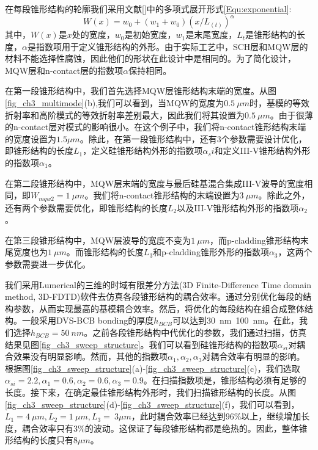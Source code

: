 在每段锥形结构的轮廓我们采用文献[]中的多项式展开形式\ref{Equ:exponential}:
\begin{equation}
\label{Equ:exponential}
W(x) = w_0+(w_1+w_0)\left(x/L_(t)\right)^\alpha
\end{equation}
其中，$W(x)$是$x$处的宽度，$w_0$是初始宽度，$w_1$是末尾宽度，$L_t$是锥形结构的长度，$\alpha$是指数项用于定义锥形结构的外形。由于实际工艺中，SCH层和MQW层的材料不能选择性腐蚀，因此他们的形状在此设计中是相同的。为了简化设计，MQW层和n-contact层的指数项$\alpha$保持相同。

在第一段锥形结构中，我们首先选择MQW层锥形结构末端的宽度。从图\ref{fig_ch3_multimode}(b),我们可以看到，当MQW的宽度为$0.5 ~ \mu m$时，基模的等效折射率和高阶模式的等效折射率差别最大，因此我们将其设置为$0.5 ~ \mu m$。由于很薄的n-contact层对模式的影响很小。在这个例子中，我们将n-contact锥形结构末端的宽度设置为$1.5 \mu m$。除此，在第一段锥形结构中，还有3个参数需要设计优化，即锥形结构的长度$L_1$，定义硅锥形结构外形的指数项$\alpha_si$和定义III-V锥形结构外形的指数项$\alpha_1$。

在第二段锥形结构中，MQW层末端的宽度与最后硅基混合集成III-V波导的宽度相同，即$W_{mqw2} = 1~\mu m$。我们将n-contact锥形结构的末端设置为$3~\mu m$。除此之外，还有两个参数需要优化，即锥形结构的长度$L_2$以及III-V锥形结构外形的指数项$\alpha_2$。

在第三段锥形结构中，MQW层波导的宽度不变为$1~\mu m$，而p-cladding锥形结构末尾宽度也为$1~\mu m$。而锥形结构的长度$L_3$和p-cladding锥形外形的指数项$\alpha_3$，这两个参数需要进一步优化。

我们采用Lumerical的三维的时域有限差分方法(3D Finite-Difference Time domain method, 3D-FDTD)软件去仿真各段锥形结构的耦合效率\cite{fdtdsolution}。通过分别优化每段的结构参数，从而实现最高的基模耦合效率。然后，将优化的每段结构在组合成整体结构。一般采用DVS-BCB bonding的厚度$h_{BCB}$可以达到30~nm~100~nm。在此，我们选择$h_{BCB} = 50~nm$。之前各段锥形结构中代优化的参数，我们通过扫描，仿真结果见图\ref{fig_ch3_sweep_structure}。我们可以看到硅锥形结构的指数项$\alpha_{si}$对耦合效果没有明显影响。然而，其他的指数项$\alpha_1, \alpha_2,\alpha_3$对耦合效率有明显的影响。根据图\ref{fig_ch3_sweep_structure}(a)-\ref{fig_ch3_sweep_structure}(c)，我们选取$\alpha_{si} = 2.2, \alpha_1 = 0.6, \alpha_2 = 0.6, \alpha_3 = 0.9$。在扫描指数项是，锥形结构必须有足够的长度。接下来，在确定最佳锥形结构外形时，我们扫描锥形结构的长度。从图\ref{fig_ch3_sweep_structure}(d)-\ref{fig_ch3_sweep_structure}(f)，我们可以看到，$L_1 = 4~ \mu m, L_2 = 1~\mu m, L_3 = ~ 3 \mu m $，此时耦合效率已经达到96\%以上，继续增加长度，耦合效率只有3\%的波动。这保证了每段锥形结构都是绝热的。因此，整体锥形结构的长度只$有8 \mu m$。

